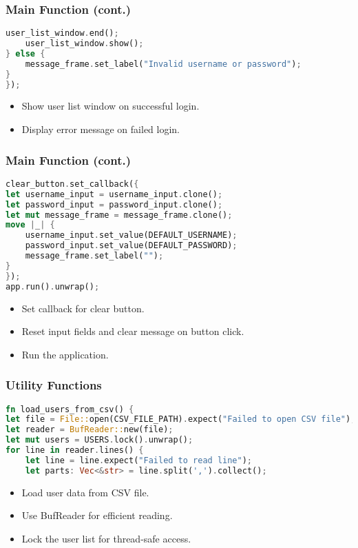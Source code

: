 \documentclass[aspectratio=169, table]{beamer}
\begin{document}
\begin{frame}[fragile]
\frametitle{Main Function (cont.)}
\begin{lstlisting}[language=Rust]
	user_list_window.end();
	user_list_window.show();
} else {
	message_frame.set_label("Invalid username or password");
}
});
\end{lstlisting}
\begin{itemize}
\item Show user list window on successful login.
\item Display error message on failed login.
\end{itemize}
\end{frame}

\begin{frame}[fragile]
\frametitle{Main Function (cont.)}
\vspace{15pt}
\begin{lstlisting}[language=Rust]
clear_button.set_callback({
let username_input = username_input.clone();
let password_input = password_input.clone();
let mut message_frame = message_frame.clone();
move |_| {
	username_input.set_value(DEFAULT_USERNAME);
	password_input.set_value(DEFAULT_PASSWORD);
	message_frame.set_label("");
}
});
app.run().unwrap();
\end{lstlisting}
\begin{itemize}
\item Set callback for clear button.
\item Reset input fields and clear message on button click.
\item Run the application.
\end{itemize}
\end{frame}

\begin{frame}[fragile]
\frametitle{Utility Functions}
\begin{lstlisting}[language=Rust]
fn load_users_from_csv() {
let file = File::open(CSV_FILE_PATH).expect("Failed to open CSV file");
let reader = BufReader::new(file);
let mut users = USERS.lock().unwrap();
for line in reader.lines() {
	let line = line.expect("Failed to read line");
	let parts: Vec<&str> = line.split(',').collect();
\end{lstlisting}
\begin{itemize}
	\item Load user data from CSV file.
	\item Use BufReader for efficient reading.
	\item Lock the user list for thread-safe access.
\end{itemize}
\end{frame}
\end{document}
